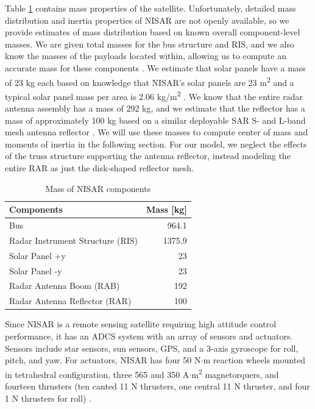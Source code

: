 Table \ref{tab:mass} contains mass properties of the satellite. Unfortunately, detailed mass distribution and inertia properties of NISAR are not openly available, so we provide estimates of mass distribution based on known overall component-level masses. We are given total masses for the bus structure and RIS, and we also know the masses of the payloads located within, allowing us to compute an accurate mass for these components \cite{NISARMission}. We estimate that solar panels have a mass of 23 kg each based on knowledge that NISAR's solar panels are 23 m\textsuperscript{2} and a typical solar panel mass per area is 2.06 kg/m\textsuperscript{2} \cite{SolarPanelMass}. We know that the entire radar antenna assembly has a mass of 292 kg, and we estimate that the reflector has a mass of approximately 100 kg based on a similar deployable SAR S- and L-band mesh antenna reflector \cite{L3Harris}. We will use these masses to compute center of mass and moments of inertia in the following section. For our model, we neglect the effects of the truss structure supporting the antenna reflector, instead modeling the entire RAR as just the disk-shaped reflector mesh.

\begin{longtable}{l|r}
\caption{Mass of NISAR components}
\label{tab:mass}\\
\textbf{Components}              & \multicolumn{1}{l}{\textbf{Mass [kg]}} \\ \hline
\endfirsthead
%
\endhead
%
Bus                              & 964.1                                      \\
Radar Instrument Structure (RIS) & 1375.9                                     \\
Solar Panel +y                   & 23                                         \\
Solar Panel -y                   & 23                                         \\
Radar Antenna Boom (RAB)         & 192                                        \\
Radar Antenna Reflector (RAR)    & 100                                       
\end{longtable}

Since NISAR is a remote sensing satellite requiring high attitude control performance, it has an ADCS system with an array of sensors and actuators. Sensors include star sensors, sun sensors, GPS, and a 3-axis gyroscope for roll, pitch, and yaw. For actuators, NISAR has four 50 N$\cdot$m reaction wheels mounted in tetrahedral configuration, three 565 and 350 A$\cdot$m\textsuperscript{2} magnetorquers, and fourteen thrusters (ten canted 11 N thrusters, one central 11 N thruster, and four 1 N thrusters for roll) \cite{NISARMission}.

